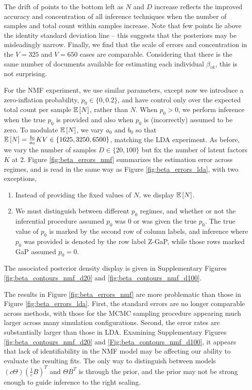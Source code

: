 \documentclass[oupdraft]{bio}
\begin{document}
The drift of points to the bottom left as $N$ and $D$ increase reflects the
improved accuracy and concentration of all inference techniques when the number
of samples and total count within samples increase. Note that few points lie
above the identity standard deviation line -- this suggests that the posteriors
may be misleadingly narrow. Finally, we find that the scale of errors and
concentration in the $V = 325$ and $V = 650$ cases are comparable. Considering
that there is the same number of documents available for estimating each
individual $\beta_{vk}$, this is not surprising.

For the NMF experiment, we use similar parameters, except now we introduce a
zero-inflation probability, $p_{0} \in \{0, 0.2\}$, and have control only over
the expected total count per sample $\mathbb{E}\left[{N}\right]$, rather than $N$. When $p_{0} >
0$, we perform inference when the true $p_0$ is provided and also when $p_{0}$
is (incorrectly) assumed to be zero. To modulate $\mathbb{E}\left[{N}\right]$, we vary $a_{0}$ and
$b_{0}$ so that $\mathbb{E}\left[{N}\right] = \frac{b_{0}}{a_{0}}KV \in \{1625, 3250, 6500\}$,
matching the LDA experiment. As before, we vary the number of samples $D \in
\{20, 100\}$ but fix the number of latent factors $K$ at 2. Figure
\ref{fig:beta_errors_nmf} summarizes the estimation error across regimes, and is
read in the same way as Figure \ref{fig:beta_errors_lda}, with two exceptions,
\begin{enumerate}
\item Instead of providing the fixed values of $N$, we display $\mathbb{E}\left[{N}\right]$.
\item We must distinguish between different $p_{0}$ regimes, and whether or not
  the inferential procedure assumed $p_{0}$ was 0 or was given the true $p_{0}$.
  The true value of $p_0$ is marked by the second row of column labels, and
  inference where $p_{0}$ was provided is denoted by the row label Z-GaP, while
  those rows marked GaP assumed $p_{0} = 0$.
\end{enumerate}
The associated posterior density display is given in Supplementary Figures
\ref{fig:beta_contours_nmf_d20} and \ref{fig:beta_contours_nmf_d100}.

The results in Figure \ref{fig:beta_errors_nmf} are more problematic than those
in Figure \ref{fig:beta_errors_lda}. First, the standard errors are no longer
comparable across methods, with those for the MCMC sampling procedure appearing
much larger across many simulation configurations. Second, the error rates are
substantially larger than those in LDA. Examining Supplementary Figures
\ref{fig:beta_contours_nmf_d20} and \ref{Fig:beta_contours_nmf_d100}, it appears
that lack of identifiability in the NMF model may be affecting our ability to
evaluate the resulting fits. The only way to distinguish between models
$\left(c\Theta\right)\left(\frac{1}{c} B\right)^{T}$ and $\Theta B^{T}$ is
through the prior, and the prior may not be strong enough to guide inference to
the right scaling.
\end{document}
